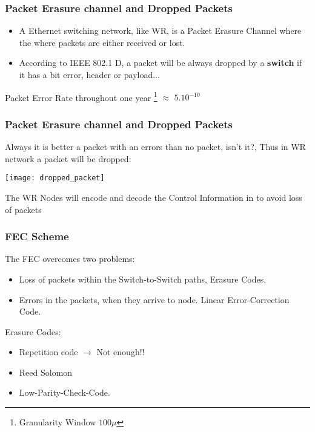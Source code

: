 \documentclass[]{beamer}
\begin{document}
\begin{frame}
\frametitle{Packet Erasure channel and Dropped Packets}

\begin{itemize}
	\item A Ethernet switching network, like WR, is a Packet Erasure Channel where the where packets are either received or lost.

\item According to IEEE 802.1 D, a packet will be always dropped by a \textbf{ switch} if it has a bit error, header or payload... 
\end{itemize}

Packet Error Rate throughout one year \footnote{Granularity Window $100\mu$}  $\approx$ $5.10^{-10}$

\end{frame}

\begin{frame}

\frametitle{Packet Erasure channel and Dropped Packets}

Always it is better a packet with an errors than no packet, isn't it?, Thus in WR network a packet will be dropped:

\begin{center}
  \texttt{[image: dropped\_packet]}


\end{center}
The WR Nodes will encode and decode the Control Information in to avoid loss of packets
\end{frame}

\begin{frame}
\frametitle{FEC Scheme}
The FEC overcomes two problems:
\begin{itemize}
	\item Loss of packets within the Switch-to-Switch paths, Erasure Codes.
	\item Errors in the packets, when they arrive to node. Linear Error-Correction Code.
\end{itemize}


Erasure Codes: 
\begin{itemize}
	\item Repetition code $\rightarrow$ Not enough!! 
	\item Reed Solomon 
	\item Low-Parity-Check-Code.
\end{itemize}
\end{frame}
\end{document}
